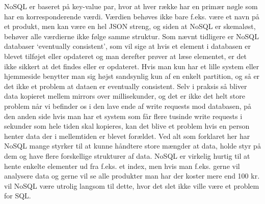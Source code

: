 NoSQL er baseret på key-value par, hvor at hver række har en primær nøgle som har en korresponderende værdi. 
Værdien behøves ikke bare f.eks. være et navn på et produkt, men kan være en hel JSON streng, 
og siden at NoSQL er skemaløst, behøver alle værdierne ikke følge samme struktur. Som nævnt tidligere 
er NoSQL databaser ‘eventually consistent’, som vil sige at hvis et element i databasen er blevet tilføjet
eller opdateret og man derefter prøver at læse elementet, er det ikke sikkert at det findes eller er opdateret. 
Hvis man kun har et lille system eller hjemmeside benytter man sig højst sandsynlig kun af en enkelt partition, 
og så er det ikke et problem at dataen er eventually consistent. 
Selv i praksis så bliver data kopieret mellem mirrors over millisekunder, og det er ikke det helt store 
problem når vi befinder os i den lave ende af write requests mod databasen, på den anden side hvis man har 
et system som får flere tusinde write requests i sekunder som hele tiden skal kopieres, 
kan det blive et problem hvis en person henter data der i mellemtiden er blevet forældet. 
Ved alt som forklaret her har NoSQL mange styrker til at kunne håndtere store mængder at data, 
holde styr på dem og have flere forskellige strukturer af data. NoSQL er virkelig hurtig til at hente 
enkelte elementer ud fra f.eks. et index, men hvis man f.eks. gerne vil analysere data og gerne vil se alle 
produkter man har der koster mere end 100 kr. vil NoSQL være utrolig langsom til dette, 
hvor det slet ikke ville være et problem for SQL. 
